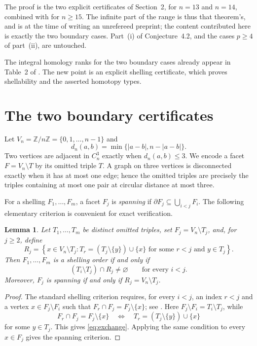 \documentclass[11pt]{amsart}
\newtheorem{lemma}[theorem]{Lemma}
\theoremstyle{remark}
\newcommand{\Z}{\mathbb Z}
\begin{document}
The proof is the two explicit certificates of Section~2, for $n=13$ and
$n=14$, combined with \cite[Theorem~1.4]{CS} for $n\ge15$.  The infinite part
of the range is thus that theorem's, and \cite{CS} is at the time of writing
an unrefereed preprint; the content contributed here is exactly the two
boundary cases.  Part~\textup{(i)} of Conjecture~4.2, and the cases $p\ge4$
of part~\textup{(ii)}, are untouched.

The integral homology ranks for the two boundary cases already appear in
Table~2 of \cite{CSV}.  The new point is an explicit shelling certificate,
which proves shellability and the asserted homotopy types.

\section{The two boundary certificates}

Let $V_n=\Z/n\Z=\{0,1,\ldots,n-1\}$ and
\[
  d_n(a,b)=\min\{|a-b|,n-|a-b|\}.
\]
Two vertices are adjacent in $C_n^3$ exactly when $d_n(a,b)\le3$.
We encode a facet $F=V_n\setminus T$ by its omitted triple $T$.
A graph on three vertices is disconnected exactly when it has at most one
edge; hence the omitted triples are precisely the triples containing at most
one pair at circular distance at most three.

For a shelling $F_1,\ldots,F_m$, a facet $F_j$ is \emph{spanning} if
$\partial F_j\subseteq\bigcup_{i<j}F_i$.
The following elementary criterion is convenient for exact verification.

\begin{lemma}\label{lem:criterion}
Let $T_1,\ldots,T_m$ be distinct omitted triples, set
$F_j=V_n\setminus T_j$, and, for $j\ge2$, define
\[
  R_j=\left\{
  x\in V_n\setminus T_j:
  T_r=(T_j\setminus\{y\})\cup\{x\}
  \text{ for some }r<j\text{ and }y\in T_j
  \right\}.
\]
Then $F_1,\ldots,F_m$ is a shelling order if and only if
\begin{equation}\label{eq:exchange}
  (T_i\setminus T_j)\cap R_j\ne\varnothing
  \qquad\text{for every }i<j.
\end{equation}
Moreover, $F_j$ is spanning if and only if
$R_j=V_n\setminus T_j$.
\end{lemma}

\begin{proof}
The standard shelling criterion requires, for every $i<j$, an index $r<j$
and a vertex $x\in F_j\setminus F_i$ such that
$F_r\cap F_j=F_j\setminus\{x\}$; see \cite[Definition~2.2]{CS}.
Here $F_j\setminus F_i=T_i\setminus T_j$, while
\[
  F_r\cap F_j=F_j\setminus\{x\}
  \quad\Longleftrightarrow\quad
  T_r=(T_j\setminus\{y\})\cup\{x\}
\]
for some $y\in T_j$.  This gives \eqref{eq:exchange}.  Applying the same
condition to every $x\in F_j$ gives the spanning criterion.
\end{proof}
\end{document}
